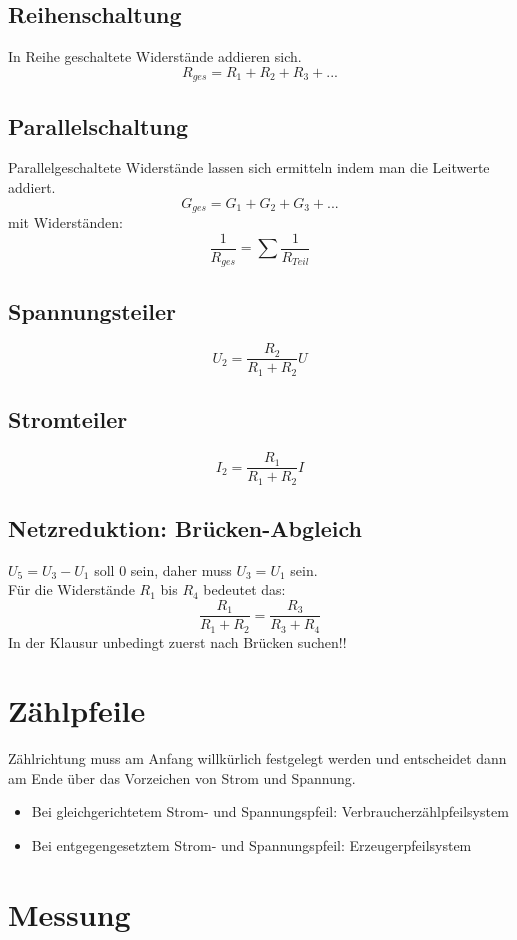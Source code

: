 \documentclass[12pt,a4paper]{article}
\begin{document}
\subsection{Reihenschaltung}
In Reihe geschaltete Widerstände addieren sich.
\[R_{ges} = R_1 + R_2 + R_3 + ...\]

\subsection{Parallelschaltung}
Parallelgeschaltete Widerstände lassen sich ermitteln indem man die Leitwerte addiert.
\[G_{ges} = G_1 + G_2 + G_3+...\]
mit Widerständen:
\[\frac{1}{R_{ges}} = \sum\frac{1}{R_{Teil}}\]

\subsection{Spannungsteiler}
\[U_2 = \frac{R_2}{R_1+R_2}U\]

\subsection{Stromteiler}
\[I_2 = \frac{R_1}{R_1+R_2}I\]

\subsection{Netzreduktion: Brücken-Abgleich}
$U_5 = U_3 - U_1$ soll 0 sein, daher muss $U_3 = U_1$ sein.\\
Für die Widerstände $R_1$ bis $R_4$ bedeutet das:
\[\frac{R_1}{R_1+R_2} = \frac{R_3}{R_3+R_4}\]
In der Klausur unbedingt zuerst nach Brücken suchen!!

\section{Zählpfeile}
Zählrichtung muss am Anfang willkürlich festgelegt werden und entscheidet dann am Ende über das Vorzeichen
von Strom und Spannung.\\
\begin{itemize}
\item
Bei gleichgerichtetem Strom- und Spannungspfeil: Verbraucherzählpfeilsystem\\
\item
Bei entgegengesetztem Strom- und Spannungspfeil: Erzeugerpfeilsystem\\
\end{itemize}

\section{Messung}
\end{document}

